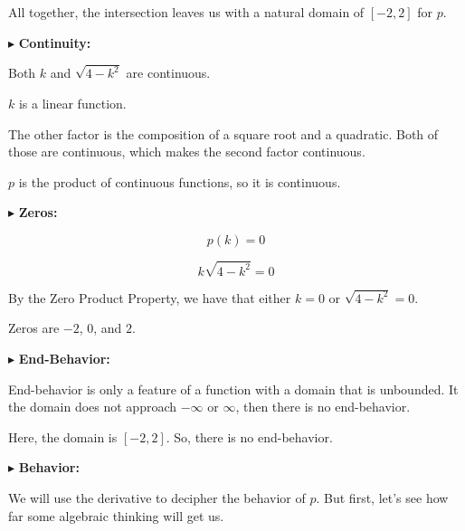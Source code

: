 \documentclass{ximera}
\begin{document}
All together, the intersection leaves us with a natural domain of $[-2, 2]$ for $p$.





$\blacktriangleright$  \textbf{\textcolor{blue!55!black}{Continuity:}} 

Both $k$ and $\sqrt{4 - k^2}$ are continuous. 


$k$ is a linear function. 


The other factor is the composition of a square root and a quadratic. Both of those are continuous, which makes the second factor continuous. 



$p$ is the product of continuous functions, so it is continuous.












$\blacktriangleright$  \textbf{\textcolor{blue!55!black}{Zeros:}} 


\[  p(k) = 0   \]

\[  k \sqrt{4-k^2} = 0  \]


By the Zero Product Property, we have that either $k = 0$ or $\sqrt{4-k^2} = 0$.


Zeros are $-2$, $0$, and $2$. 








$\blacktriangleright$ \textbf{\textcolor{blue!55!black}{End-Behavior:}}  


End-behavior is only a feature of a function with a domain that is unbounded.  It the domain does not approach $-\infty$ or $\infty$, then there is no end-behavior.


Here, the domain is $[-2, 2]$.  So, there is no end-behavior. 













$\blacktriangleright$ \textbf{\textcolor{blue!55!black}{Behavior:}}  



We will use the derivative to decipher the behavior of $p$.  But first, let's see how far some algebraic thinking will get us. 
\end{document}
